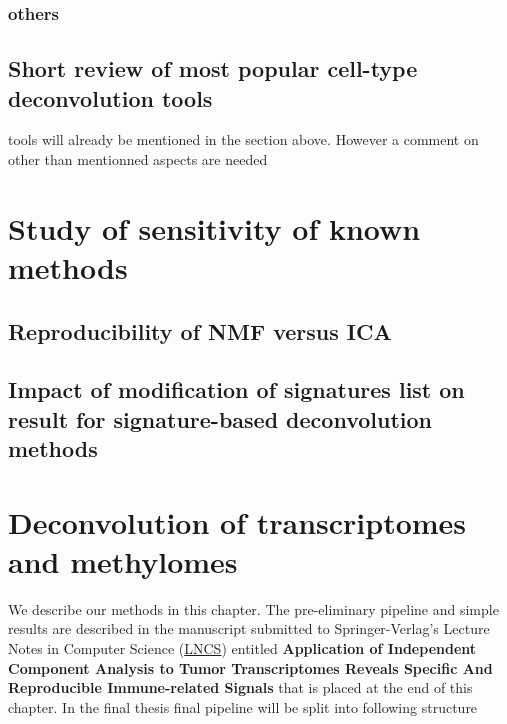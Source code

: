 \documentclass[12pt,]{book}
\theoremstyle{definition}
\theoremstyle{definition}
\theoremstyle{definition}
\theoremstyle{remark}
\begin{document}
\hypertarget{others}{%
\subsection{others}\label{others}}

\hypertarget{short-review-of-most-popular-cell-type-deconvolution-tools}{%
\section{Short review of most popular cell-type deconvolution
tools}\label{short-review-of-most-popular-cell-type-deconvolution-tools}}

tools will already be mentioned in the section above. However a comment
on other than mentionned aspects are needed

\hypertarget{study-of-sensitivity-of-known-methods}{%
\chapter{Study of sensitivity of known
methods}\label{study-of-sensitivity-of-known-methods}}

\hypertarget{reproducibility-of-nmf-versus-ica}{%
\section{Reproducibility of NMF versus
ICA}\label{reproducibility-of-nmf-versus-ica}}

\hypertarget{impact-of-modification-of-signatures-list-on-result-for-signature-based-deconvolution-methods}{%
\section{Impact of modification of signatures list on result for
signature-based deconvolution
methods}\label{impact-of-modification-of-signatures-list-on-result-for-signature-based-deconvolution-methods}}

\hypertarget{deconvolution-of-transcriptomes-and-methylomes}{%
\chapter{Deconvolution of transcriptomes and
methylomes}\label{deconvolution-of-transcriptomes-and-methylomes}}

We describe our methods in this chapter. The pre-eliminary pipeline and
simple results are described in the manuscript submitted to
Springer-Verlag's Lecture Notes in Computer Science
(\href{http://www.springer.com/gb/computer-science/lncs}{LNCS}) entitled
\textbf{Application of Independent Component Analysis to Tumor
Transcriptomes Reveals Specific And Reproducible Immune-related Signals}
that is placed at the end of this chapter. In the final thesis final
pipeline will be split into following structure
\end{document}
